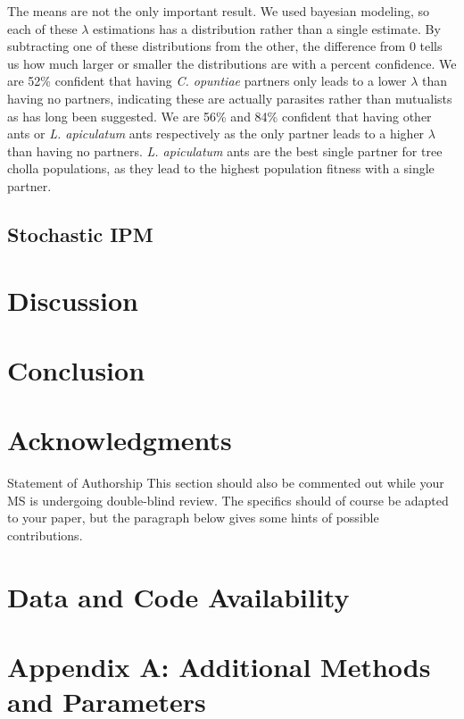\documentclass[11pt]{article}
\begin{document}
{{The means are not the only important result.
We used bayesian modeling, so each of these $\lambda$ estimations has a distribution rather than a single estimate.
By subtracting one of these distributions from the other, the difference from 0 tells us how much larger or smaller the distributions are with a percent confidence. 
We are 52\% confident that having \textit{C. opuntiae} partners only leads to a lower $\lambda$ than having no partners, indicating these are actually parasites rather than mutualists as has long been suggested.
We are 56\% and 84\% confident that having other ants or \textit{L. apiculatum} ants respectively as the only partner leads to a higher $\lambda$ than having no partners.
\textit{L. apiculatum} ants are the best single partner for tree cholla populations, as they lead to the highest population fitness with a single partner.


\subsection*{Stochastic IPM}


\section*{Discussion}


\section*{Conclusion}

\section*{Acknowledgments}

 Statement of Authorship
 This section should also be commented out while your MS is undergoing
 double-blind review. The specifics should of course be adapted to
 your paper, but the paragraph below gives some hints of possible
 contributions.}}

\section*{Data and Code Availability}

\section*{Appendix A: Additional Methods and Parameters}
\end{document}
